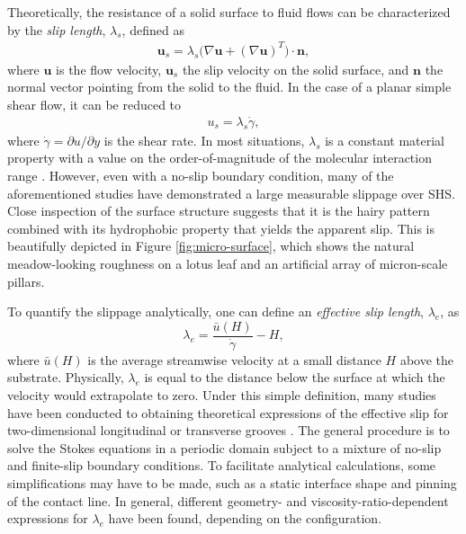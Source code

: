 Theoretically, the resistance of a solid surface to fluid flows can be characterized by the \emph{slip length}, $\lambda_s$, defined as
\begin{equation}
 \begin{aligned}
  \bm{u}_s = \lambda_s \bigg( \nabla {\bm u} + (\nabla {\bm u})^T \bigg) \cdot \bm{n},
 \end{aligned}
\end{equation}
where $\bm{u}$ is the flow velocity, $\bm{u}_s$ the slip velocity on the solid surface, and $\bm n$ the normal vector pointing from the solid to the fluid.
In the case of a planar simple shear flow, it can be reduced to
\begin{equation}
 \begin{aligned}
  u_s = \lambda_s \dot{\gamma},
 \end{aligned}
\end{equation}
where $\dot{\gamma}=\partial u/\partial y$ is the shear rate.
In most situations, $\lambda_s$ is a constant material property with a value on the order-of-magnitude of the molecular interaction range \citep{Thompson_Troian_1997}.
However, even with a no-slip boundary condition, many of the aforementioned studies have demonstrated a large measurable slippage over SHS.
Close inspection of the surface structure suggests that it is the hairy pattern combined with its hydrophobic property that yields the apparent slip.
This is beautifully depicted in Figure \ref{fig:micro-surface}, which shows the natural meadow-looking roughness on a lotus leaf and an artificial array of micron-scale pillars. 

To quantify the slippage analytically, one can define an \emph{effective slip length}, $\lambda_e$, as
\begin{equation} \label{eff slip}
  \lambda_e = \frac{\bar{u}(H)}{\dot{\gamma}}-H,
\end{equation}
where $\bar{u}(H)$ is the average streamwise velocity at a small distance $H$ above the substrate.
Physically, $\lambda_e$ is equal to the distance below the surface at which the velocity would extrapolate to zero.
Under this simple definition, many studies have been conducted to obtaining theoretical expressions of the effective slip for two-dimensional longitudinal or transverse grooves \citep{Lauga_Stone, Sbragalia_Prosperetti, Davis_Lauga, Ng_Wang, Schonecker, Nizkaya, Crowdy_tran, Crowdy_long}.
The general procedure is to solve the Stokes equations in a periodic domain subject to a mixture of no-slip and finite-slip boundary conditions. To facilitate analytical calculations, some simplifications may have to be made, such as a static interface shape and pinning of the contact line.
In general, different geometry- and viscosity-ratio-dependent expressions for $\lambda_e$ have been found, depending on the configuration.

